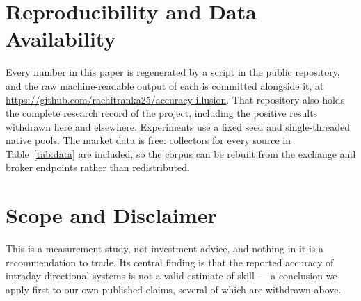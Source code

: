 \documentclass[sigconf,nonacm]{acmart}
\begin{document}
\section*{Reproducibility and Data Availability}

Every number in this paper is regenerated by a script in the public repository,
and the raw machine-readable output of each is committed alongside it, at
\url{https://github.com/rachitranka25/accuracy-illusion}. That repository also
holds the complete research record of the project, including the positive
results withdrawn here and elsewhere. Experiments use a fixed seed and
single-threaded native pools. The market data is free: collectors for every
source in Table~\ref{tab:data} are included, so the corpus can be rebuilt from
the exchange and broker endpoints rather than redistributed.

\section*{Scope and Disclaimer}

This is a measurement study, not investment advice, and nothing in it is a
recommendation to trade. Its central finding is that the reported accuracy of
intraday directional systems is not a valid estimate of skill --- a conclusion
we apply first to our own published claims, several of which are withdrawn
above.
\end{document}
